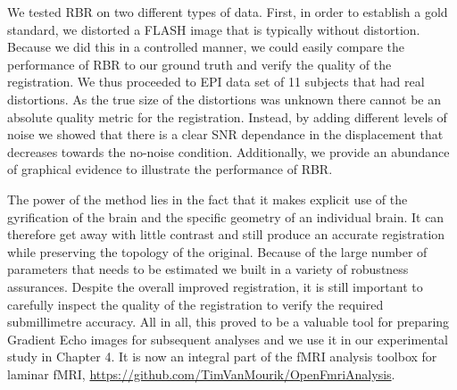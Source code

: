 We tested RBR on two different types of data. First, in order to establish a gold standard, we distorted a FLASH image that is typically without distortion. Because we did this in a controlled manner, we could easily compare the performance of RBR to our ground truth and verify the quality of the registration. We thus proceeded to EPI data set of 11 subjects that had real distortions. As the true size of the distortions was unknown there cannot be an absolute quality metric for the registration. Instead, by adding different levels of noise we showed that there is a clear SNR dependance in the displacement that decreases towards the no-noise condition. Additionally, we provide an abundance of graphical evidence to illustrate the performance of RBR.

The power of the method lies in the fact that it makes explicit use of the gyrification of the brain and the specific geometry of an individual brain. It can therefore get away with little contrast and still produce an accurate registration while preserving the topology of the original. Because of the large number of parameters that needs to be estimated we built in a variety of robustness assurances. Despite the overall improved registration, it is still important to carefully inspect the quality of the registration to verify the required submillimetre accuracy. All in all, this proved to be a valuable tool for preparing Gradient Echo images for subsequent analyses and we use it in our experimental study in Chapter 4. It is now an integral part of the fMRI analysis toolbox for laminar fMRI, \url{https://github.com/TimVanMourik/OpenFmriAnalysis}.


